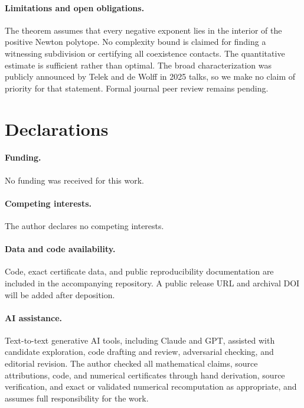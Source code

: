 \documentclass[11pt]{article}
\theoremstyle{plain}
\theoremstyle{definition}
\theoremstyle{remark}
\begin{document}
\paragraph{Limitations and open obligations.}
The theorem assumes that every negative exponent lies in the interior of the positive Newton polytope. No complexity bound is claimed for finding a witnessing subdivision or certifying all coexistence contacts. The quantitative estimate is sufficient rather than optimal. The broad characterization was publicly announced by Telek and de Wolff in 2025 talks, so we make no claim of priority for that statement. Formal journal peer review remains pending.

\section*{Declarations}
\paragraph{Funding.} No funding was received for this work.
\paragraph{Competing interests.} The author declares no competing interests.
\paragraph{Data and code availability.} Code, exact certificate data, and public reproducibility documentation are included in the accompanying repository. A public release URL and archival DOI will be added after deposition.
\paragraph{AI assistance.} Text-to-text generative AI tools, including Claude and GPT, assisted with candidate exploration, code drafting and review, adversarial checking, and editorial revision. The author checked all mathematical claims, source attributions, code, and numerical certificates through hand derivation, source verification, and exact or validated numerical recomputation as appropriate, and assumes full responsibility for the work.


\end{document}
